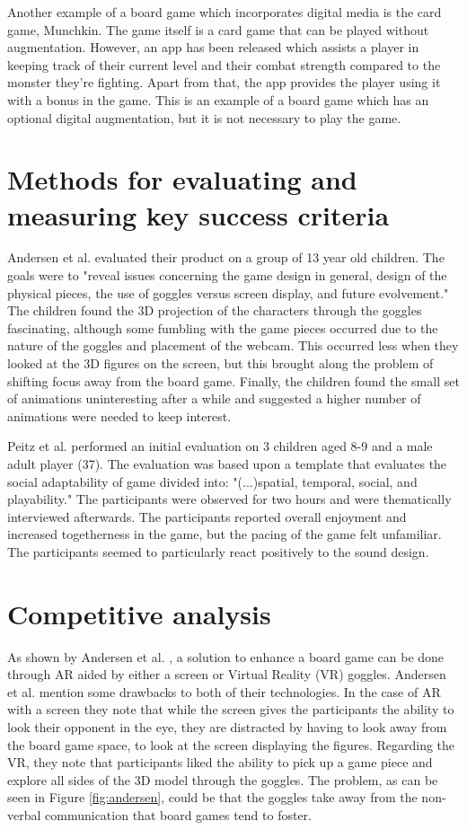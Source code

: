 Another example of a board game which incorporates digital media is the card game, Munchkin. The game itself is a card game that can be played without augmentation. However, an app has been released which assists a player in keeping track of their current level and their combat strength compared to the monster they're fighting. Apart from that, the app provides the player using it with a bonus in the game. This is an example of a board game which has an optional digital augmentation, but it is not necessary to play the game.

\section{Methods for evaluating and measuring key success criteria}
Andersen et al. \citep{andersen_designing_2004} evaluated their product on a group of 13 year old children. The goals were to "reveal issues concerning the game design in general, design of the physical pieces, the use of goggles versus screen display, and future evolvement." The children found the 3D projection of the characters through the goggles fascinating, although some fumbling with the game pieces occurred due to the nature of the goggles and placement of the webcam. This occurred less when they looked at the 3D figures on the screen, but this brought along the problem of shifting focus away from the board game.
Finally, the children found the small set of animations uninteresting after a while and suggested a higher number of animations were needed to keep interest.

Peitz et al. \citep{peitzWizards2006} performed an initial evaluation on 3 children aged 8-9 and a male adult player (37). The evaluation was based upon a template that evaluates the social adaptability of game divided into: "(...)spatial, temporal, social, and playability." The participants were observed for two hours and were thematically interviewed afterwards. The participants reported overall enjoyment and increased togetherness in the game, but the pacing of the game felt unfamiliar. The participants seemed to particularly react positively to the sound design. 

\section{Competitive analysis}
As shown by Andersen et al. \citep{andersen_designing_2004}, a solution to enhance a board game can be done through AR aided by either a screen or Virtual Reality (VR) goggles. Andersen et al. mention some drawbacks to both of their technologies. In the case of AR with a screen they note that while the screen gives the participants the ability to look their opponent in the eye, they are distracted by having to look away from the board game space, to look at the screen displaying the figures. Regarding the VR, they note that participants liked the ability to pick up a game piece and explore all sides of the 3D model through the goggles. The problem, as can be seen in Figure \ref{fig:andersen}, could be that the goggles take away from the non-verbal communication that board games tend to foster.


